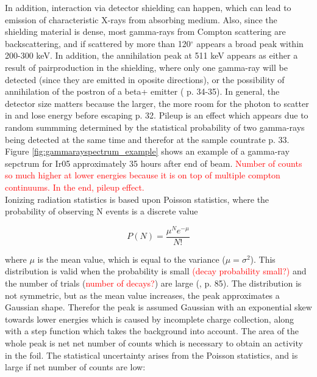 In addition, interaction via detector shielding can happen, which can lead to emission of characteristic X-rays from absorbing medium. Also, since the shielding material is dense, most gamma-rays from Compton scattering are backscattering, and if scattered by more than 120$^\circ$ appears a broad peak within 200-300 keV. In addition, the annihilation peak at 511 keV appears as either a result of pairproduction in the shielding, where only one gamma-ray will be detected (since they are emitted in oposite directions), or the possibility of annihilation of the postron of a beta+ emitter (\cite{Gilmore2008} p. 34-35). In general, the detector size matters because the larger, the more room for the photon to scatter in and lose energy before escaping \cite{Gilmore2008} p. 32. Pileup is an effect which appears due to random summming determined by the statistical probability of two gamma-rays being detected at the same time and therefor at the sample countrate \cite{Gilmore2008} p. 33. Figure \ref{fig:gammarayspectrum_example} shows an example of a gamma-ray sepctrum for Ir05 approximately 35 hours after end of beam. \textcolor{red}{Number of counts so much higher at lower energies because it is on top of multiple compton continuums. In the end, pileup effect. } \\



\noindent 
Ionizing radiation statistics is based upon Poisson statistics, where the probability of observing N events is a discrete value

\begin{equation}
    P(N)=\frac{\mu^N e^{-\mu}}{N!}
\end{equation}

where $\mu$ is the mean value, which is equal to the variance ($\mu=\sigma^2$). This distribution is valid when the probability is small \textcolor{red}{(decay probability small?)} and the number of trials (\textcolor{red}{number of decays?}) are large (\cite{Leo1994}, p. 85).  The distribution is not symmetric, but as the mean value increases, the peak approximates a Gaussian shape. Therefor the peak is assumed Gaussian with an exponential skew towards lower energies which is caused by incomplete charge collection, along with a step function which takes the background into account. The area of the whole peak is net net number of counts which is necessary to obtain an activity in the foil. The statistical uncertainty arises from the Poisson statistics, and is large if net number of counts are low:

